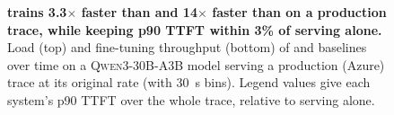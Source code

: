 \begin{figure}[t]
  \centering
  \caption{\textbf{\sys trains 3.3$\times$ faster than \llmstation and 14$\times$ faster than \uncoord on a production trace, while keeping p90 \ac{TTFT} within 3\% of serving alone.}
  Load (top) and fine-tuning throughput (bottom) of \sys and baselines over time on a \textsc{Qwen3-30B-A3B} model serving a production (Azure) trace at its original rate (with \SI{30}{\second} bins).
  Legend values give each system’s p90 \ac{TTFT} over the whole trace, relative to serving alone.}
  \label{fig:intro-trace}

\end{figure}

